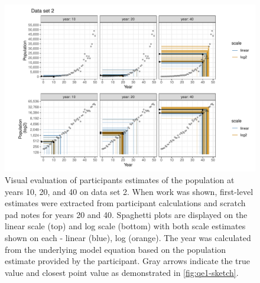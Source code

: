 \documentclass[print]{nuthesis}
\begin{document}
\begin{figure}[tbp]

{\centering \includegraphics[width=1\linewidth,]{thesis_files/figure-latex/spaghetti-dataset2-1} 

}

\caption[Estimated population spaghetti plot: data set 2]{Visual evaluation of participants estimates of the population at years 10, 20, and 40 on data set 2. When work was shown, first-level estimates were extracted from participant calculations and scratch pad notes for years 20 and 40. Spaghetti plots are displayed on the linear scale (top) and log scale (bottom) with both scale estimates shown on each - linear (blue), log (orange). The year was calculated from the underlying model equation based on the population estimate provided by the participant. Gray arrows indicate the true value and closest point value as demonstrated in \cref{fig:qe1-sketch}.}\label{fig:spaghetti-dataset2}
\end{figure}
\end{document}

